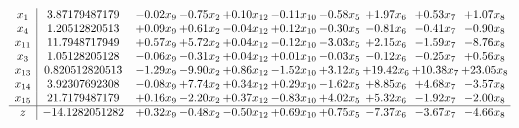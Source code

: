 \documentclass[9pt]{article}
\begin{document}
\[\begin{array}{c| c c@{\hskip 2pt} c@{\hskip 2pt} c@{\hskip 2pt} c@{\hskip 2pt} c@{\hskip 2pt} c@{\hskip 2pt} c@{\hskip 2pt} c@{\hskip 2pt} }
 x_{1}   &  3.87179487179 & -0.02 x_{9} & -0.75 x_{2} & +  0.10 x_{12} & -0.11 x_{10} & -0.58 x_{5} & +  1.97 x_{6} & +  0.53 x_{7} & +  1.07 x_{8}\\
 x_{4}   &  1.20512820513 & +  0.09 x_{9} & +  0.61 x_{2} & -0.04 x_{12} & +  0.12 x_{10} & -0.30 x_{5} & -0.81 x_{6} & -0.41 x_{7} & -0.90 x_{8}\\
 x_{11}   &  11.7948717949 & +  0.57 x_{9} & +  5.72 x_{2} & +  0.04 x_{12} & -0.12 x_{10} & -3.03 x_{5} & +  2.15 x_{6} & -1.59 x_{7} & -8.76 x_{8}\\
 x_{3}   &  1.05128205128 & -0.06 x_{9} & -0.31 x_{2} & +  0.04 x_{12} & +  0.01 x_{10} & -0.03 x_{5} & -0.12 x_{6} & -0.25 x_{7} & +  0.56 x_{8}\\
 x_{13}   &  0.820512820513 & -1.29 x_{9} & -9.90 x_{2} & +  0.86 x_{12} & -1.52 x_{10} & +  3.12 x_{5} & + 19.42 x_{6} & + 10.38 x_{7} & + 23.05 x_{8}\\
 x_{14}   &  3.92307692308 & -0.08 x_{9} & +  7.74 x_{2} & +  0.34 x_{12} & +  0.29 x_{10} & -1.62 x_{5} & +  8.85 x_{6} & +  4.68 x_{7} & -3.57 x_{8}\\
 x_{15}   &  21.7179487179 & +  0.16 x_{9} & -2.20 x_{2} & +  0.37 x_{12} & -0.83 x_{10} & +  4.02 x_{5} & +  5.32 x_{6} & -1.92 x_{7} & -2.00 x_{8}\\
\hline
z    &  -14.1282051282 & +  0.32 x_{9} & -0.48 x_{2} & -0.50 x_{12} & +  0.69 x_{10} & +  0.75 x_{5} & -7.37 x_{6} & -3.67 x_{7} & -4.66 x_{8}\\
\end{array}\]
\end{document}

